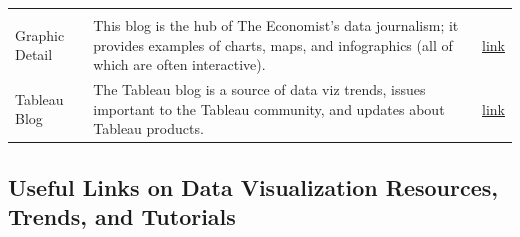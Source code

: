 \documentclass[]{book}
\begin{document}
\begin{longtable}[]{@{}lll@{}}
\begin{minipage}[t]{0.24\columnwidth}
\end{minipage}\tabularnewline
\begin{minipage}[t]{0.24\columnwidth}\raggedright
Graphic Detail\strut
\end{minipage} & \begin{minipage}[t]{0.44\columnwidth}\raggedright
This blog is the hub of The Economist's data journalism; it provides examples of charts, maps, and infographics (all of which are often interactive).\strut
\end{minipage} & \begin{minipage}[t]{0.24\columnwidth}\raggedright
\href{https://www.economist.com/blogs/graphicdetail}{link}\strut
\end{minipage}\tabularnewline
\begin{minipage}[t]{0.24\columnwidth}\raggedright
Tableau Blog\strut
\end{minipage} & \begin{minipage}[t]{0.44\columnwidth}\raggedright
The Tableau blog is a source of data viz trends, issues important to the Tableau community, and updates about Tableau products.\strut
\end{minipage} & \begin{minipage}[t]{0.24\columnwidth}\raggedright
\href{https://www.tableau.com/about/blog}{link}\strut
\end{minipage}\tabularnewline
\bottomrule
\end{longtable}

\hypertarget{useful-links-on-data-visualization-resources-trends-and-tutorials-1}{%
\subsection{Useful Links on Data Visualization Resources, Trends, and Tutorials}\label{useful-links-on-data-visualization-resources-trends-and-tutorials-1}}
\end{document}
